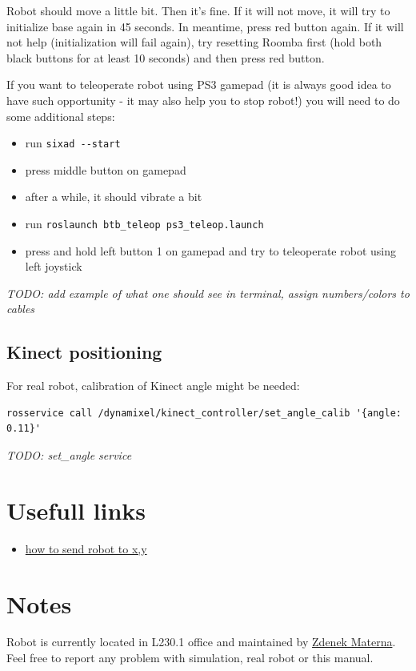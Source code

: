 \documentclass[12pt,a4paper,titlepage]{article}
\numberwithin{equation}{subsection}
\begin{document}
Robot should move a little bit. Then it's fine. If it will not move, it will try to initialize base again in 45 seconds. In meantime, press red button again. If it will not help (initialization will fail again), try resetting Roomba first (hold both black buttons for at least 10 seconds) and then press red button.

If you want to teleoperate robot using PS3 gamepad (it is always good idea to have such opportunity - it may also help you to stop robot!) you will need to do some additional steps:

\begin{itemize}
 \item{run \verb|sixad --start|}
 \item{press middle button on gamepad}
 \item{after a while, it should vibrate a bit}
 \item{run \verb|roslaunch btb_teleop ps3_teleop.launch|}
 \item{press and hold left button 1 on gamepad and try to teleoperate robot using left joystick}
\end{itemize}

\emph{TODO: add example of what one should see in terminal, assign numbers/colors to cables}

\subsection{Kinect positioning}

For real robot, calibration of Kinect angle might be needed:

\begin{verbatim}
rosservice call /dynamixel/kinect_controller/set_angle_calib '{angle: 0.11}'
\end{verbatim}

\emph{TODO: set\_angle service}

\section{Usefull links}

\begin{itemize}
 \item{\href{http://www.ros.org/wiki/navigation/Tutorials/SendingSimpleGoals}{how to send robot to x,y}}
\end{itemize}

\section{Notes}
\label{sec:notes}

Robot is currently located in L230.1 office and maintained by \href{mailto:imaterna@fit.vutbr.cz}{Zdenek Materna}. Feel free to report any problem with simulation, real robot or this manual.
\end{document}
